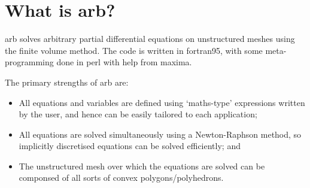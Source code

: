 
\section{What is arb?}

arb solves arbitrary partial differential equations on unstructured meshes using the finite volume method.  The code is written in fortran95, with some meta-programming done in perl with help from maxima.

The primary strengths of arb are:
%
\begin{itemize}
\item  All equations and variables are defined using `maths-type' expressions written by the user, and hence can be easily tailored to each application;
\item  All equations are solved simultaneously using a Newton-Raphson method, so implicitly discretised equations can be solved efficiently; and
\item  The unstructured mesh over which the equations are solved can be componsed of all sorts of convex polygons/polyhedrons.
\end{itemize}
 
